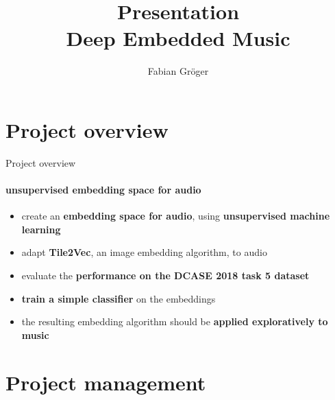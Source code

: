 \documentclass[aspectratio=169, professionalfonts]{beamer}
\title[Deep Embedded Music]{Presentation\\ Deep Embedded Music}
\author[F. Gröger]{Fabian Gröger}
\begin{document}
	\typesetFrontSlides


\section{Project overview}


\begin{frame}{Project overview}
	\framesubtitle{unsupervised embedding space for audio}
	\begin{itemize}
		\item create an \textbf{embedding space for audio}, using \textbf{unsupervised machine learning}
        \item adapt \textbf{Tile2Vec}, an image embedding algorithm, to audio
        \item evaluate the \textbf{performance on the DCASE 2018 task 5 dataset}
        \item \textbf{train a simple classifier} on the embeddings
        \item the resulting embedding algorithm should be \textbf{applied exploratively to music}
	\end{itemize}
	
\end{frame}

\section{Project management}

\end{document}
